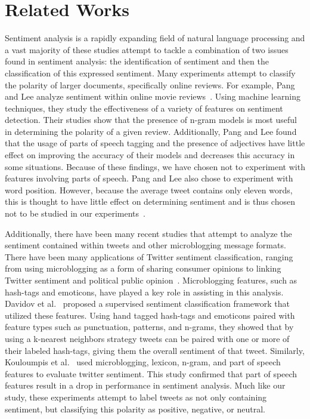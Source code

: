 \documentclass[11pt]{article}
\begin{document}
\section{Related Works}
Sentiment analysis is a rapidly expanding field of natural language processing and a vast majority of these studies attempt to tackle a combination of two issues found in sentiment analysis: the identification of sentiment and then the classification of this expressed sentiment.  Many experiments attempt to classify the polarity of larger documents, specifically online reviews. For example, Pang and Lee analyze sentiment within online movie reviews~\cite{pang2002thumbs}. Using machine learning techniques, they study the effectiveness of a variety of features on sentiment detection. Their studies show that the presence of n-gram models is most useful in determining the polarity of a given review. Additionally, Pang and Lee found that the usage of parts of speech tagging and the presence of adjectives have little effect on improving the accuracy of their models and decreases this accuracy in some situations. Because of these findings, we have chosen not to experiment with features involving parts of speech. Pang and Lee also chose to experiment with word position. However, because the average tweet contains only eleven words, this is thought to have little effect on determining sentiment and is thus chosen not to be studied in our experiments~\cite{oconnor2010tweets}.

Additionally, there have been many recent studies that attempt to analyze the sentiment contained within tweets and other microblogging message formats. There have been many applications of Twitter sentiment classification, ranging from using microblogging as a form of sharing consumer opinions to linking Twitter sentiment and political public opinion~\cite{jansen2009twitter,oconnor2010tweets}. Microblogging features, such as hash-tags and emoticons, have played a key role in assisting in this analysis. Davidov et al.~ proposed a supervised sentiment classification framework that utilized these features. Using hand tagged hash-tags and emoticons paired with feature types such as punctuation, patterns, and n-grams, they showed that by using a k-nearest neighbors strategy tweets can be paired with one or more of their labeled hash-tags, giving them the overall sentiment of that tweet. Similarly, Kouloumpis et al.~ used microblogging, lexicon, n-gram, and part of speech features to evaluate twitter sentiment. This study confirmed that part of speech features result in a drop in performance in sentiment analysis.  Much like our study, these experiments attempt to label tweets as not only containing sentiment, but classifying this polarity as positive, negative, or neutral. 
\end{document}
